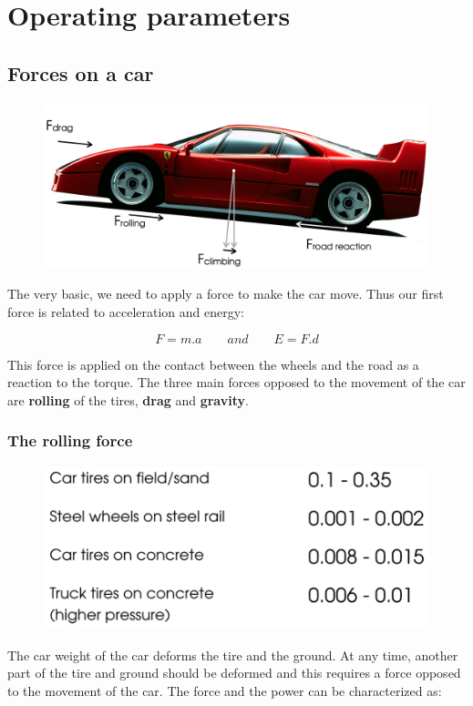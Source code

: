 
\chapter{Operating parameters}
\section{Forces on a car}
	\begin{figure}
	\vspace{-5mm}
	\includegraphics[scale=0.2]{ch2/1}
	\end{figure}
	The very basic, we need to apply a force to make the car move. Thus our first force is related to acceleration and energy: 
	
	\begin{equation}
	F = m.a \qquad and \qquad E= F.d
	\end{equation}
	
	This force is applied on the contact between the wheels and the road as a reaction to the torque. The three main forces opposed to the movement of the car are \textbf{rolling} of the tires, \textbf{drag} and \textbf{gravity}.
	
\subsection{The rolling force}
	\begin{figure}
	\vspace{-15mm}
	\includegraphics[scale=0.3]{ch2/2}
	\label{fig:2.2}
	\end{figure}
	The car weight of the car deforms the tire and the ground. At any time, another part of the tire and ground should be deformed and this requires a force opposed to the movement of the car. The force and the power can be characterized as:
	
